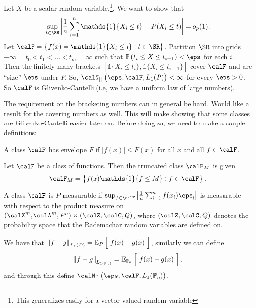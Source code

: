 \begin{example*}
	Let \(X\) be a scalar random variable.\footnote{This generalizes easily for a vector valued random variable}. We want to show that 
	\[
		\sup_{t\in\SR}\bigg| \frac{1}{n}\sum_{i=1}^n \mathds{1}\{X_i\leq t\}-P(X_i\leq t)\bigg|=o_p(1)
	.\]
	Let \(\calF = \left\{f(x)=\mathds{1}\{X_i\leq t\}: t \in \SR\right\}\). Partition \(\SR\) into grids  \(-\infty = t_0 < t_1 < \dots< t_m = \infty\) such that \(\P\left(t_i \leq X \leq t_{i+1}\right)<\eps\) for each \(i\). Then the finitely many brackets \(\left[\mathds{1}\{X_i \leq t_i\},\mathds{1}\{X_i \leq t_{i+1}\}\right]\) cover \(\calF\) and are ``size'' \(\eps\) under \(P\). So, \(\calN_{[\hspace{0.1em}]}\left(\eps,\calF,L_1(P)\right)<\infty\) for every \(\eps>0\). So \(\calF\) is Glivenko-Cantelli (i.e, we have a uniform law of large numbers).
\end{example*}
The requirement on the bracketing numbers can in general be hard. Would like a result for the covering numbers as well. This will make showing that some classes are Glivenko-Cantelli easier later on. Before doing so, we need to make a couple definitions:
\begin{definition}[Envelope]
	\label{def:envelope}
	A class \(\calF\) has envelope \(F\) if \(|f(x)|\leq F(x)\) for all \(x\) and all \(f\in\calF\).
\end{definition}
\begin{definition}
	\label{def:truncated-class}
	Let \(\calF\) be a class of functions. Then the truncated class \(\calF_M\) is given 
	\[
		\calF_M = \left\{f(x)\mathds{1}\{f \leq M\}: f\in\calF\right\}	
	.\]
\end{definition}
\begin{definition}
	\label{def:p-measurable-class}
	A class \(\calF\) is \(P\)-measurable if \(\sup_{f\in\calF}\left|\frac{1}{n}\sum_{i=1}^n f(x_i)\eps_i\right|\) is measurable with respect to the product measure on \((\calX^m,\calA^m,P^n)\times(\calZ,\calC,Q)\), where \((\calZ,\calC,Q)\) denotes the probability space that the Rademachar random variables are defined on.
\end{definition}
\begin{definition}[\(L_p(\P_n)\)-norm]
	\label{def:lpn-norm}
	We have that \(\left\|f-g\right\|_{L_1(P)} = \mathbb{E}_P\left[\left|f(x)-g(x)\right|\right]\), similarly we can define 
	\[
			\left\|f-g\right\|_{L_{1(\mathbb{P}_n)}} = \mathbb{E}_{\mathbb{P}_n}\left[\left|f(x)-g(x)\right|\right]
	.\]
	and through this define \(\calN_{[\hspace{0.1em}]}\left(\eps,\calF,L_1(\P_n)\right)\).
 \end{definition}
